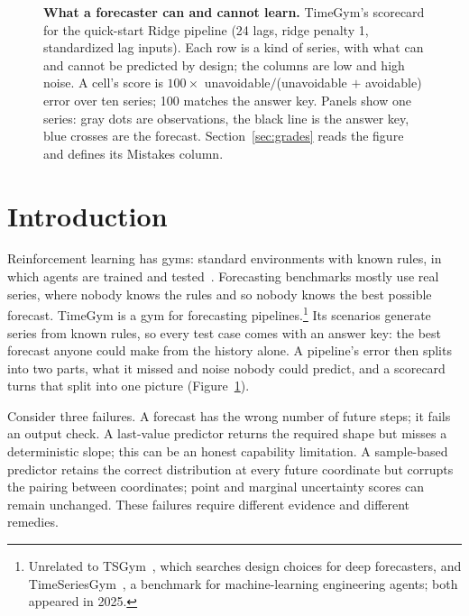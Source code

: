\documentclass[11pt,a4paper]{article}
\begin{document}
\begin{figure}[p]
\centering

\caption{\textbf{What a forecaster can and cannot learn.} TimeGym's
scorecard for the quick-start Ridge pipeline (24 lags, ridge penalty 1,
standardized lag inputs). Each row is a kind of series, with what can and
cannot be predicted by design; the columns are low and high noise. A
cell's score is $100\times$ unavoidable$/$(unavoidable $+$ avoidable)
error over ten series; 100 matches the answer key. Panels show one series:
gray dots are observations, the black line is the answer key, blue crosses
are the forecast. Section~\ref{sec:grades} reads the figure and defines
its Mistakes column.}
\label{fig:scorecard}
\end{figure}

\section{Introduction}

Reinforcement learning has gyms: standard environments with known rules,
in which agents are trained and tested~\cite{brockman2016gym}. Forecasting
benchmarks mostly use real series, where nobody knows the rules and so
nobody knows the best possible forecast. TimeGym is a gym for forecasting
pipelines.\footnote{Unrelated to TSGym~\cite{liang2025tsgym}, which
searches design choices for deep forecasters, and
TimeSeriesGym~\cite{cai2025timeseriesgym}, a benchmark for
machine-learning engineering agents; both appeared in 2025.} Its scenarios generate series from known rules, so every test
case comes with an answer key: the best forecast anyone could make from
the history alone. A pipeline's error then splits into two parts, what it
missed and noise nobody could predict, and a scorecard turns that split
into one picture (Figure~\ref{fig:scorecard}).

Consider three failures. A forecast has the wrong number of future steps;
it fails an output check. A last-value predictor returns
the required shape but misses a deterministic slope; this can be an honest
capability limitation. A sample-based predictor retains the correct
distribution at every future coordinate but corrupts the pairing between
coordinates; point and marginal uncertainty scores can remain unchanged.
These failures require different evidence and different remedies.
\end{document}
